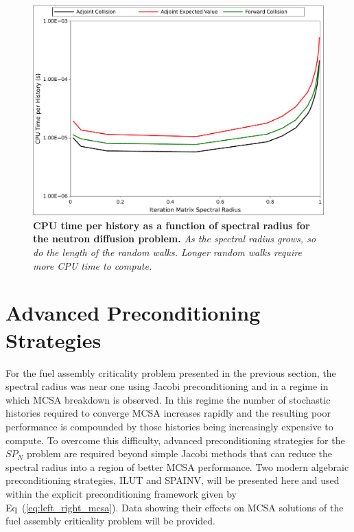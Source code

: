 \begin{figure}[t!]
  \begin{center}
    \includegraphics[width=4.5in]{chapters/spn_equations/breakdown_time.pdf}
  \end{center}
  \caption{\textbf{CPU time per history as a function of spectral
      radius for the neutron diffusion problem.} \textit{As the
      spectral radius grows, so do the length of the random
      walks. Longer random walks require more CPU time to compute.}}
  \label{fig:breakdown_time}
\end{figure}

\clearpage

\section{Advanced Preconditioning Strategies}
\label{subsec:spn_advanced_preconditioning}
For the fuel assembly criticality problem presented in the previous
section, the spectral radius was near one using Jacobi preconditioning
and in a regime in which MCSA breakdown is observed. In this regime
the number of stochastic histories required to converge MCSA increases
rapidly and the resulting poor performance is compounded by those
histories being increasingly expensive to compute. To overcome this
difficulty, advanced preconditioning strategies for the $SP_N$ problem
are required beyond simple Jacobi methods that can reduce the spectral
radius into a region of better MCSA performance. Two modern algebraic
preconditioning strategies, ILUT and SPAINV, will be presented here
and used within the explicit preconditioning framework given by
Eq~(\ref{eq:left_right_mcsa}). Data showing their effects on MCSA
solutions of the fuel assembly criticality problem will be provided.

